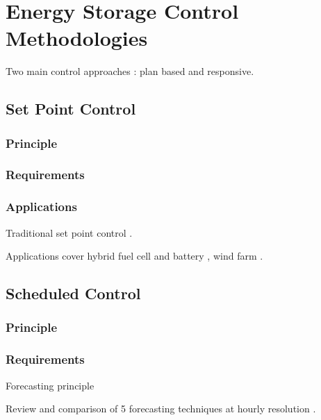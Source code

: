 \section{Energy Storage Control Methodologies}
\label{ch-review:sec:energy-storage-control-methodologies}

Two main control approaches \cite{Hida2010}: plan based and responsive.


\subsection{Set Point Control}

\subsubsection{Principle}

\subsubsection{Requirements}

\subsubsection{Applications}

Traditional set point control \cite{Leadbetter2012}.

Applications cover hybrid fuel cell and battery \cite{Jiang2007}, wind farm \cite{Teleke2009a}.

\subsection{Scheduled Control}

\subsubsection{Principle}

\subsubsection{Requirements}

Forecasting principle \cite{Ramanathan1997}

Review and comparison of 5 forecasting techniques at hourly resolution \cite{Moghram1989}.


